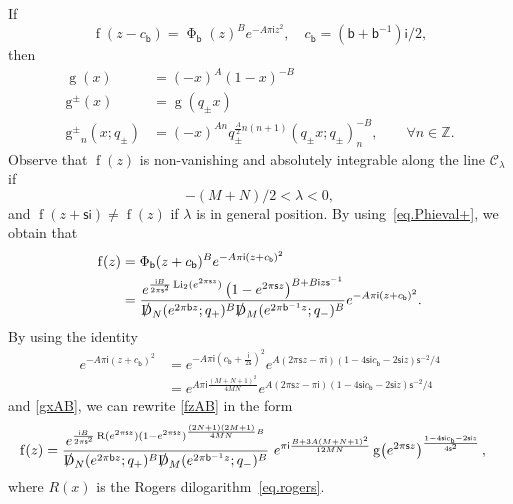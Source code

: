 \documentclass[12pt]{amsart}
\theoremstyle{definition}
\newcommand{\im}{\mathsf{i}}
\newcommand{\fad}[1]{\operatorname{\Phi}_{#1}}
\begin{document}
If
\begin{equation}
\operatorname{f}(z-c_{\mathsf{b}})=\fad{\mathsf{b}}(z)^Be^{-A\pi\im z^2},
\quad c_{\mathsf{b}}=(\mathsf{b}+\mathsf{b}^{-1})\im/2,
\end{equation}
then
\begin{subequations}
\begin{align}
\label{gxAB}
\operatorname{g}\!\left(x\right) &= 
\left(-x \right)^A\! \left(1-x\right)^{-B}
\\
\operatorname{g^\pm}(x)&=\operatorname{g}\!\left(q_\pm x\right)
\\
\operatorname{g^\pm}_n(x;q_\pm)&=\left(-x \right)^{An}\!
q_\pm^{\frac{A}{2}n(n+1)}\!\left(q_\pm x;q_\pm\right)_{n}^{-B},\qquad 
\forall n\in\mathbb{Z}.
\end{align}
\end{subequations}
Observe that $\operatorname{f}(z)$ is non-vanishing and absolutely 
integrable along the line $\mathcal{C}_{\lambda}$ if
\begin{equation}
-(M+N)/2<\lambda<0,
\end{equation}
and $\operatorname{f}(z+\mathsf{s}\im)\ne \operatorname{f}(z)$ if 
$\lambda$ is in general position. 
By using~\eqref{eq.Phieval+}, we obtain that
\begin{align}
\label{fzAB}
\operatorname{f}(z)&=\fad{\mathsf{b}}(z+c_{\mathsf{b}})^B
e^{-A\pi\im (z+c_{\mathsf{b}})^2} \\ \notag 
&
=\frac{e^{\frac{\im B}{2\pi\mathsf{s}^2}\operatorname{Li_2}(e^{2\pi\mathsf{s}z})}
\left(1-e^{2\pi\mathsf{s}z}\right)^{B+B\im z\mathsf{s}^{-1}}}{
\slashed{\operatorname{D}}_N(e^{2\pi\mathsf{b}z};q_+)^B
\slashed{\operatorname{D}}_M(e^{2\pi\mathsf{b}^{-1}z};q_-)^B}
e^{-A\pi\im (z+c_{\mathsf{b}})^2}.
\end{align}
By using the identity
\begin{align*}
e^{-A\pi\im (z+c_{\mathsf{b}})^2} &=
e^{-A\pi\im \left(c_{\mathsf{b}}+\frac{\im}{2\mathsf{s}}\right)^2}
e^{A(2\pi\mathsf{s}z-\pi\im) (1-4\mathsf{s}\im c_{\mathsf{b}} -2\mathsf{s}\im z)\mathsf{s}^{-2}/4}
\\
&=e^{A\pi\im \frac{(M+N+1)^2}{4 M N}}
e^{A(2\pi\mathsf{s}z-\pi\im) (1-4\mathsf{s}\im c_{\mathsf{b}} -2\mathsf{s}\im z)\mathsf{s}^{-2}/4}
\end{align*}
and \eqref{gxAB}, we can rewrite \eqref{fzAB} in the form
\begin{align}
\label{eq.fzval}
\operatorname{f}(z)&=
\frac{e^{\frac{\im B}{2\pi \mathsf{s}^2}\operatorname{R}(e^{2\pi\mathsf{s}z})
(1-e^{2\pi\mathsf{s}z})^{\frac{(2N+1)(2M+1)}{4 M N}B}
}}{
\slashed{\operatorname{D}}_N(e^{2\pi\mathsf{b}z};q_+)^B
\slashed{\operatorname{D}}_M(e^{2\pi\mathsf{b}^{-1}z};q_-)^B} 
\,\, e^{\pi\im \frac{B+3A(M+N+1)^2}{12 M N}} 
\operatorname{g}\!\left(e^{2\pi\mathsf{s}z}
\right)^{\frac{1-4\mathsf{s}\im c_{\mathsf{b}} -2\mathsf{s}\im z}{4\mathsf{s}^{2}}},
\end{align}
where $R(x)$ is the Rogers dilogarithm~\eqref{eq.rogers}.
\end{document}
